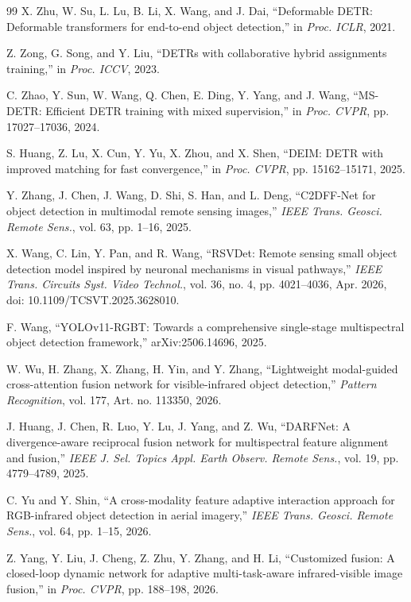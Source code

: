\documentclass[letterpaper,journal]{IEEEtran}
\begin{document}
\begin{thebibliography}{99}
X. Zhu, W. Su, L. Lu, B. Li, X. Wang, and J. Dai, ``Deformable DETR: Deformable transformers for end-to-end object detection,'' in \emph{Proc. ICLR}, 2021.


Z. Zong, G. Song, and Y. Liu, ``DETRs with collaborative hybrid assignments training,'' in \emph{Proc. ICCV}, 2023.


C. Zhao, Y. Sun, W. Wang, Q. Chen, E. Ding, Y. Yang, and J. Wang, ``MS-DETR: Efficient DETR training with mixed supervision,'' in \emph{Proc. CVPR}, pp. 17027--17036, 2024.

S. Huang, Z. Lu, X. Cun, Y. Yu, X. Zhou, and X. Shen, ``DEIM: DETR with improved matching for fast convergence,'' in \emph{Proc. CVPR}, pp. 15162--15171, 2025.

Y. Zhang, J. Chen, J. Wang, D. Shi, S. Han, and L. Deng, ``C2DFF-Net for object detection in multimodal remote sensing images,'' \emph{IEEE Trans. Geosci. Remote Sens.}, vol. 63, pp. 1--16, 2025.


X. Wang, C. Lin, Y. Pan, and R. Wang, ``RSVDet: Remote sensing small object detection model inspired by neuronal mechanisms in visual pathways,'' \emph{IEEE Trans. Circuits Syst. Video Technol.}, vol. 36, no. 4, pp. 4021--4036, Apr. 2026, doi: 10.1109/TCSVT.2025.3628010.


F. Wang, ``YOLOv11-RGBT: Towards a comprehensive single-stage multispectral object detection framework,'' arXiv:2506.14696, 2025.


W. Wu, H. Zhang, X. Zhang, H. Yin, and Y. Zhang, ``Lightweight modal-guided cross-attention fusion network for visible-infrared object detection,'' \emph{Pattern Recognition}, vol. 177, Art. no. 113350, 2026.


J. Huang, J. Chen, R. Luo, Y. Lu, J. Yang, and Z. Wu, ``DARFNet: A divergence-aware reciprocal fusion network for multispectral feature alignment and fusion,'' \emph{IEEE J. Sel. Topics Appl. Earth Observ. Remote Sens.}, vol. 19, pp. 4779--4789, 2025.


C. Yu and Y. Shin, ``A cross-modality feature adaptive interaction approach for RGB-infrared object detection in aerial imagery,'' \emph{IEEE Trans. Geosci. Remote Sens.}, vol. 64, pp. 1--15, 2026.


Z. Yang, Y. Liu, J. Cheng, Z. Zhu, Y. Zhang, and H. Li, ``Customized fusion: A closed-loop dynamic network for adaptive multi-task-aware infrared-visible image fusion,'' in \emph{Proc. CVPR}, pp. 188--198, 2026.



\end{thebibliography}
\end{document}

